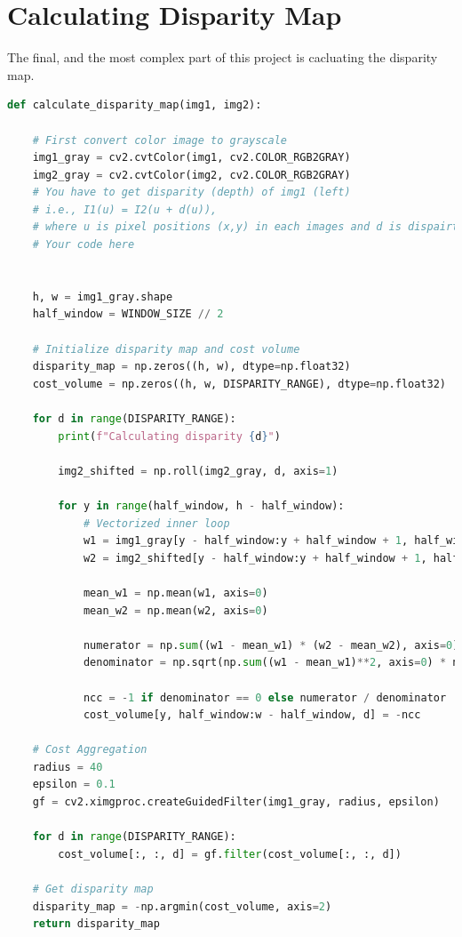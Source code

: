 \section*{Calculating Disparity Map}
The final, and the most complex part of this project is cacluating the disparity map.
\begin{lstlisting}[language=python]
def calculate_disparity_map(img1, img2):
    
    # First convert color image to grayscale
    img1_gray = cv2.cvtColor(img1, cv2.COLOR_RGB2GRAY)
    img2_gray = cv2.cvtColor(img2, cv2.COLOR_RGB2GRAY)
    # You have to get disparity (depth) of img1 (left)
    # i.e., I1(u) = I2(u + d(u)),
    # where u is pixel positions (x,y) in each images and d is dispairty map.
    # Your code here
    
    
    h, w = img1_gray.shape
    half_window = WINDOW_SIZE // 2
    
    # Initialize disparity map and cost volume
    disparity_map = np.zeros((h, w), dtype=np.float32)
    cost_volume = np.zeros((h, w, DISPARITY_RANGE), dtype=np.float32)  

    for d in range(DISPARITY_RANGE):
        print(f"Calculating disparity {d}")

        img2_shifted = np.roll(img2_gray, d, axis=1)

        for y in range(half_window, h - half_window):
            # Vectorized inner loop
            w1 = img1_gray[y - half_window:y + half_window + 1, half_window:w - half_window]
            w2 = img2_shifted[y - half_window:y + half_window + 1, half_window:w - half_window]
            
            mean_w1 = np.mean(w1, axis=0)
            mean_w2 = np.mean(w2, axis=0)
            
            numerator = np.sum((w1 - mean_w1) * (w2 - mean_w2), axis=0)
            denominator = np.sqrt(np.sum((w1 - mean_w1)**2, axis=0) * np.sum((w2 - mean_w2)**2, axis=0))

            ncc = -1 if denominator == 0 else numerator / denominator
            cost_volume[y, half_window:w - half_window, d] = -ncc

    # Cost Aggregation
    radius = 40
    epsilon = 0.1 
    gf = cv2.ximgproc.createGuidedFilter(img1_gray, radius, epsilon)

    for d in range(DISPARITY_RANGE):
        cost_volume[:, :, d] = gf.filter(cost_volume[:, :, d])
    
    # Get disparity map
    disparity_map = -np.argmin(cost_volume, axis=2)
    return disparity_map
\end{lstlisting}

